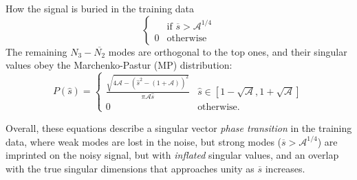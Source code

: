 \documentclass[final]{beamer}
\begin{document}
\begin{frame}[t]{}
\begin{columns}
\begin{column}[t]{0.248\textwidth}
\begin{block}{\large How the signal is buried in the training data}
\begin{equation}
\begin{cases}
& \text{if } \overline{s} > \mathcal{A}^{1/4} \\
0 & \text{otherwise}
\end{cases}
\label{eq:ovlap}
\end{equation}
The remaining $N_3 - \overline{N_2}$ modes are orthogonal to the top ones, and their singular values obey the Marchenko-Pastur (MP) distribution: 
\begin{equation}
P(\hat{s}) = \begin{cases}
\frac{\sqrt{4\mathcal{A}-(\hat{s}^2 - (1+\mathcal{A}))^2}}{\pi \mathcal{A}\hat{s}} & \hat{s} \in [1-\sqrt{\mathcal{A}}, 1+\sqrt{\mathcal{A}}] \\
0 & \text{otherwise}.
\end{cases}
\label{eq:mp}
\end{equation}

Overall, these equations describe a singular vector {\it phase transition} in the training data, where weak modes are lost in the noise, but strong modes ($\overline{s} > \mathcal{A}^{1/4}$) are imprinted on the noisy signal, but with \emph{inflated} singular values, and an overlap with the true singular dimensions that approaches unity as $\overline{s}$ increases.
\end{block}
\end{column}



\end{columns}
\end{frame}
\end{document}
